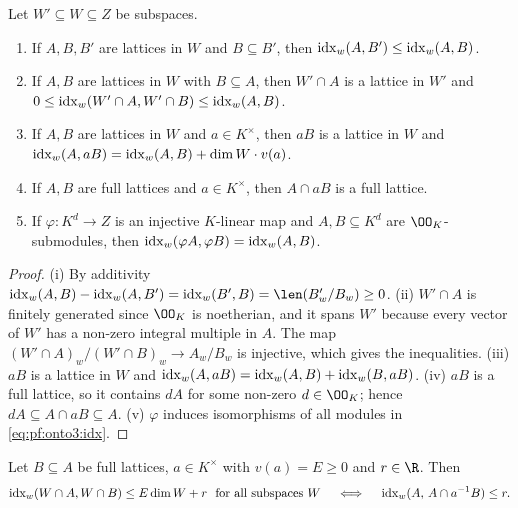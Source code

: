 \begin{lemma}\label{pf:onto3:idxbasic}
Let $W'\subseteq W\subseteq Z$ be subspaces.
\begin{enumerate}[label=(\roman*)]
\item If $A,B,B'$ are lattices in $W$ and $B\subseteq B'$, then
$\operatorname{idx}_w(A,B')\le\operatorname{idx}_w(A,B)$.
\item If $A,B$ are lattices in $W$ with $B\subseteq A$, then $W'\cap A$ is a lattice in $W'$ and
$0\le\operatorname{idx}_w(W'\cap A,W'\cap B)\le\operatorname{idx}_w(A,B)$.
\item If $A,B$ are lattices in $W$ and $a\in K^\times$, then $aB$ is a lattice in $W$ and
$\operatorname{idx}_w(A,aB)=\operatorname{idx}_w(A,B)+\dim W\cdot v(a)$.
\item If $A,B$ are full lattices and $a\in K^\times$, then $A\cap aB$ is a full lattice.
\item If $\varphi\colon K^d\to Z$ is an injective $K$-linear map and $A,B\subseteq K^d$ are
$\OO_K$-submodules, then $\operatorname{idx}_w(\varphi A,\varphi B)=\operatorname{idx}_w(A,B)$.
\end{enumerate}
\end{lemma}

\begin{proof}
(i) By additivity $\ontothreeidx_w(A,B)-\ontothreeidx_w(A,B')=\ontothreeidx_w(B',B)=\len(B'_w/B_w)\ge0$.
(ii) $W'\cap A$ is finitely generated since $\OO_K$ is noetherian, and it spans $W'$ because every vector of
$W'$ has a non-zero integral multiple in $A$. The map $(W'\cap A)_w/(W'\cap B)_w\to A_w/B_w$ is injective, which
gives the inequalities. (iii) $aB$ is a lattice in $W$ and $\operatorname{idx}_w(A,aB)=\operatorname{idx}_w(A,B)+
\operatorname{idx}_w(B,aB)$. (iv) $aB$ is a full lattice, so it contains $dA$ for some non-zero $d\in\OO_K$; hence
$dA\subseteq A\cap aB\subseteq A$. (v) $\varphi$ induces isomorphisms of all modules in
\eqref{eq:pf:onto3:idx}.
\end{proof}

\begin{lemma}\label{pf:onto3:threeforms}
Let $B\subseteq A$ be full lattices, $a\in K^\times$ with $v(a)=E\ge0$ and $r\in\R$. Then
\[
\ontothreeidx_w(W\cap A,W\cap B)\le E\dim W+r\ \text{ for all subspaces }W
\quad\iff\quad \ontothreeidx_w(A,\,A\cap a^{-1}B)\le r .
\]
\end{lemma}

